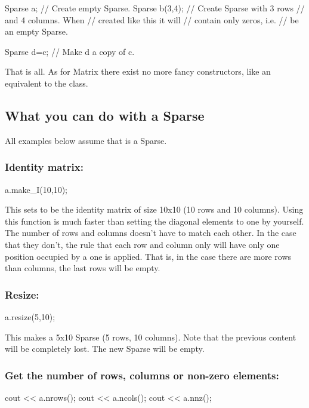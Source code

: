 \begin{code}
Sparse a;          // Create empty Sparse.
Sparse b(3,4);     // Create Sparse with 3 rows
                   // and 4 columns. When
                   // created like this it will
                   // contain only zeros, i.e.
                   // be an empty Sparse.

Sparse d=c;        // Make d a copy of c.
\end{code}

That is all. As for Matrix there exist no more fancy constructors, like an
equivalent to the  class.

\subsection{What you can do with a Sparse}
All examples below assume that  is a Sparse.

\subsubsection{Identity matrix:}
\begin{code}
a.make_I(10,10);
\end{code}
This sets  to be the identity matrix of size 10x10 (10 rows 
and 10 columns). Using this function is much faster than setting the 
diagonal elements to one by yourself. The number of rows and columns 
doesn't have to match each other. In the case that they don't, the rule 
that each row and column only will have only one position occupied by a one
is applied. That is, in the case there are more rows than columns, the last
rows will be empty.

\subsubsection{Resize:}
\begin{code}
a.resize(5,10);
\end{code}
This makes  a 5x10 Sparse (5 rows, 10 columns). Note that the
previous content will be completely lost. The new Sparse will be empty.

\subsubsection{Get the number of rows, columns or non-zero elements:}
\begin{code}
cout << a.nrows();
cout << a.ncols();
cout << a.nnz();
\end{code}


